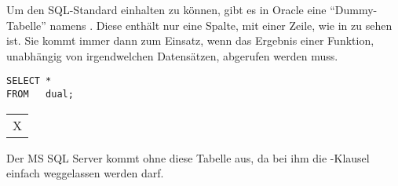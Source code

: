 			 Um den SQL-Standard einhalten zu k\"onnen, gibt es in Oracle eine
			 \enquote{Dummy-Tabelle} namens . Diese enth\"alt nur eine
			 Spalte, mit einer Zeile, wie in  zu sehen ist. Sie kommt
			 immer dann zum Einsatz, wenn das Ergebnis einer Funktion, unabh\"angig von
			 irgendwelchen Datens\"atzen, abgerufen werden muss.
        \begin{lstlisting}[language=oracle_sql,caption={Die Tabelle \identifier{dual} in Oracle},label=sql03_14]
SELECT *
FROM   dual;
        \end{lstlisting}
        \begin{center}
          \begin{small}
            \tablehead{}
            \begin{oraclesql}
              \begin{supertabular}{l}
                X \\
              \end{supertabular}
            \end{oraclesql}
          \end{small}
        \end{center}
        Der MS SQL Server kommt ohne diese Tabelle aus, da bei ihm die
        \FROM-Klausel einfach weggelassen werden darf.

